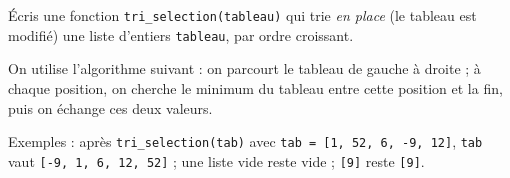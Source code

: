 Écris une fonction \texttt{tri\_selection(tableau)} qui trie \emph{en place} (le tableau est modifié) une liste d'entiers \texttt{tableau}, par ordre croissant.

On utilise l'algorithme suivant : on parcourt le tableau de gauche à droite ; à chaque position, on cherche le minimum du tableau entre cette position et la fin, puis on échange ces deux valeurs.

Exemples : après \texttt{tri\_selection(tab)} avec \texttt{tab = [1, 52, 6, -9, 12]}, \texttt{tab} vaut \texttt{[-9, 1, 6, 12, 52]} ; une liste vide reste vide ; \texttt{[9]} reste \texttt{[9]}.
